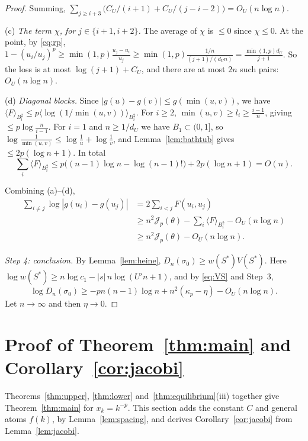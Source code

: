 \documentclass{amsart}
\theoremstyle{definition}
\theoremstyle{remark}
\numberwithin{equation}{section}
\newcommand{\cJ}{\mathcal{J}}
\begin{document}
\begin{proof}
Summing, $\sum_{j\ge i+3}\bigl(C_U/(i+1)+C_U/(j-i-2)\bigr)=O_U(n\log n)$.

(c) \emph{The term $\chi$, for $j\in\{i+1,i+2\}$.} The average of $\chi$ is $\le0$ since $\chi\le0$. At the point, by
\eqref{eq:rp}, $1-(u_i/u_j)^p\ge\min(1,p)\frac{u_j-u_i}{u_j}\ge\min(1,p)\frac{1/n}{(j+1)/(d_Un)}=
\frac{\min(1,p)d_U}{j+1}$. So the loss is at most $\log(j+1)+C_U$, and there are at most $2n$ such pairs: $O_U(n\log n)$.

(d) \emph{Diagonal blocks.} Since $|g(u)-g(v)|\le g(\min(u,v))$, we have
$\langle F\rangle_{B_i^2}\le p\langle\log(1/\min(u,v))\rangle_{B_i^2}$. For $i\ge2$, $\min(u,v)\ge l_i\ge\frac{i-1}{n}$, giving
$\le p\log\frac{n}{i-1}$. For $i=1$ and $n\ge1/d_U$ we have $B_1\subset(0,1]$, so
$\log\frac1{\min(u,v)}\le\log\frac1u+\log\frac1v$, and Lemma~\ref{lem:bathtub} gives $\le2p(\log n+1)$. In total
\[
  \sum_i\langle F\rangle_{B_i^2}\le p\bigl((n-1)\log n-\log(n-1)!\bigr)+2p(\log n+1)=O(n).
\]

Combining (a)--(d),
\begin{align*}
  \sum_{i\ne j}\log|g(u_i)-g(u_j)|&=2\sum_{i<j}F(u_i,u_j)\\
  &\ge n^2\cJ_p(\theta)-\sum_i\langle F\rangle_{B_i^2}-O_U(n\log n)\\
  &\ge n^2\cJ_p(\theta)-O_U(n\log n).
\end{align*}

\emph{Step 4: conclusion.} By Lemma~\ref{lem:heine}, $D_n(\sigma_0)\ge w(S^*)V(S^*)$. Here
$\log w(S^*)\ge n\log c_1-|s|\,n\log(U'n+1)$, and by \eqref{eq:VS} and Step~3,
\[
  \log D_n(\sigma_0)\ge-pn(n-1)\log n+n^2(\kappa_p-\eta)-O_U(n\log n).
\]
Let $n\to\infty$ and then $\eta\to0$.
\end{proof}

\section{Proof of Theorem~\ref{thm:main} and Corollary~\ref{cor:jacobi}}\label{sec:proofs}

Theorems~\ref{thm:upper}, \ref{thm:lower} and~\ref{thm:equilibrium}(iii) together give Theorem~\ref{thm:main} for
$x_k=k^{-p}$. This section adds the constant $C$ and general atoms $f(k)$, by Lemma~\ref{lem:spacing}, and derives
Corollary~\ref{cor:jacobi} from Lemma~\ref{lem:jacobi}.
\end{document}
